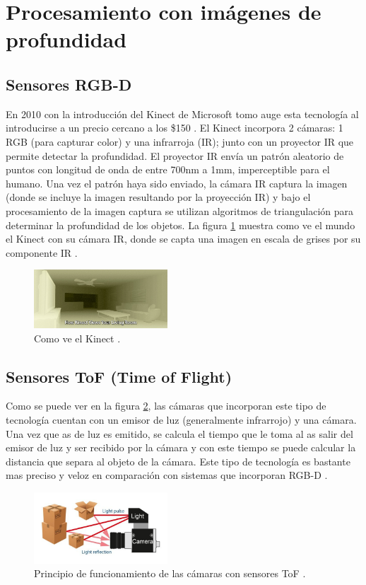 \documentclass[conference]{IEEEtran}
\begin{document}
\section{\textbf{Procesamiento con imágenes de profundidad}}
 
\subsection{\textbf{Sensores RGB-D}}
En 2010 con la introducción del Kinect de Microsoft tomo auge esta tecnología al introducirse a un precio cercano a los \$150 \cite{rgbd_pdf}. El Kinect incorpora 2 cámaras: 1 RGB (para capturar color) y una infrarroja (IR); junto con un proyector IR que permite detectar la profundidad. El proyector IR envía un patrón aleatorio de puntos con longitud de onda de entre 700nm a 1mm, imperceptible para el humano. Una vez el patrón haya sido enviado, la cámara IR captura la imagen (donde se incluye la imagen resultando por la proyección IR) y bajo el procesamiento de la imagen captura se utilizan algoritmos de triangulaci\'on para determinar la profundidad de los objetos\cite{rgbd_web}. La figura \ref{rgbd} muestra como ve el mundo el Kinect con su cámara IR, donde se capta una imagen en escala de grises por su componente IR \cite{rgbd_ppt}.

\begin{figure}[H]
\centering
\includegraphics[width=5cm]{rgbd}
\caption{Como ve el Kinect \cite{rgbd_ppt}.}
\label{rgbd}
\end{figure}

\subsection{\textbf{Sensores ToF (Time of Flight)}}
Como se puede ver en la figura \ref{tof}, las cámaras que incorporan este tipo de tecnología cuentan con un emisor de luz (generalmente infrarrojo) y una cámara. Una vez que as de luz es emitido, se calcula el tiempo que le toma al as salir del emisor de luz y ser recibido por la cámara y con este tiempo se puede calcular la distancia que separa al objeto de la cámara. Este tipo de tecnología es bastante mas preciso y veloz en comparación con sistemas que incorporan RGB-D \cite{tof_2} \cite{tof_3}.

\begin{figure}[H]
\centering
\includegraphics[width=5cm]{tof_2}
\caption{Principio de funcionamiento de las cámaras con sensores ToF \cite{tof_2}.}
\label{tof}
\end{figure}





%


\end{document}
